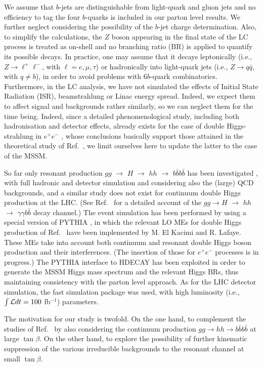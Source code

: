 We assume that $b$-jets are distinguishable from light-quark and gluon
jets and no efficiency to tag the four $b$-quarks is included in our
parton level results. We further neglect considering the possibility
of the  $b$-jet charge
determination. Also, to simplify the calculations, the $Z$ boson
appearing in the final state of the LC process is treated as
on-shell and no branching ratio
(BR) is applied to quantify its possible decays. In
practice, one may assume that it decays leptonically (i.e., $Z\to
\ell^+\ell^-$, with $\ell=e,\mu,\tau$) or hadronically into
light-quark jets (i.e., $Z\to q\bar q$, with $q\ne b$), in order to
avoid problems with $6b$-quark combinatorics.  Furthermore, in the LC
analysis, we have not simulated the effects of Initial State Radiation
(ISR), beamstrahlung or Linac energy spread.  Indeed, we expect them
to affect signal and backgrounds rather similarly, so we can neglect
them for the time being. Indeed, since a detailed phenomenological
study, including both hadronisation and detector effects, already
exists for the case of double Higgs-strahlung in $e^+e^-$ \cite{Lutz},
whose conclusions basically support those attained in the
theoretical study of Ref.~\cite{noi}, we limit ourselves here to
update the latter to the case of the MSSM.

So far only resonant production $gg$ $\to$ $H$ $\to$ $hh$ $\to$ 
$b\bar bb\bar b$ has been investigated
\cite{ATLTDR}, with  full hadronic and detector simulation and
considering also the (large) QCD backgrounds, and a similar study
does not exist for continuum double Higgs production at the LHC. 
(See Ref.~\cite{ERW} for a detailed account of the $gg\to H$ $\to$
$hh$ $\to$ $\gamma\gamma b\bar b$ decay channel.)
The event simulation has been
performed by using a special version of {\sc PYTHIA} \cite{pythia1}, in
which the relevant LO MEs for double Higgs production of
Ref.~\cite{spira} have been implemented by M. El Kacimi and R. Lafaye.
These MEs take into account both continuum and resonant
double Higgs boson production and their interferences.
(The insertion of those for $e^+e^-$ processes is in progress.) The
{\sc PYTHIA} interface to {\sc HDECAY} has been exploited in order to
generate the MSSM Higgs mass spectrum and the relevant Higgs BRs, thus
maintaining consistency with the parton level approach.  As for the
LHC detector simulation, the fast simulation package
was used, with high luminosity (i.e., $\int{\cal L}dt=100$ fb$^{-1}$)
parameters. 

The motivation for our study is twofold. On the one
hand, to complement the studies of Ref.~\cite{ATLTDR} by also
considering the continuum production $gg\to hh\to b\bar b b\bar b$
at large $\tan\beta$. On the other hand, to explore the 
possibility of further kinematic suppression
of the various irreducible backgrounds to the resonant channel
at small $\tan\beta$.

